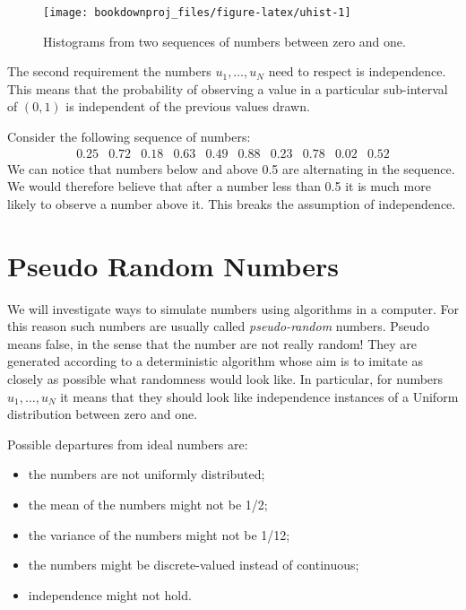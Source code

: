 \documentclass[
]{book}
\begin{document}
\begin{figure}

{\centering \texttt{[image: bookdownproj\_files/figure-latex/uhist-1]} 

}

\caption{Histograms from two sequences of numbers between zero and one.}\label{fig:uhist}
\end{figure}

The second requirement the numbers \(u_1,\dots,u_N\) need to respect is independence. This means that the probability of observing a value in a particular sub-interval of \((0,1)\) is independent of the previous values drawn.

Consider the following sequence of numbers:
\[
\begin{array}{cccccccccc}
0.25 & 0.72 & 0.18 & 0.63 & 0.49 & 0.88 & 0.23 & 0.78 & 0.02 & 0.52
\end{array}
\]
We can notice that numbers below and above 0.5 are alternating in the sequence. We would therefore believe that after a number less than 0.5 it is much more likely to observe a number above it. This breaks the assumption of independence.

\hypertarget{pseudo-random-numbers}{%
\section{Pseudo Random Numbers}\label{pseudo-random-numbers}}

We will investigate ways to simulate numbers using algorithms in a computer. For this reason such numbers are usually called \emph{pseudo-random} numbers. Pseudo means false, in the sense that the number are not really random! They are generated according to a deterministic algorithm whose aim is to imitate as closely as possible what randomness would look like. In particular, for numbers \(u_1,\dots,u_N\) it means that they should look like independence instances of a Uniform distribution between zero and one.

Possible departures from ideal numbers are:

\begin{itemize}
\item
  the numbers are not uniformly distributed;
\item
  the mean of the numbers might not be 1/2;
\item
  the variance of the numbers might not be 1/12;
\item
  the numbers might be discrete-valued instead of continuous;
\item
  independence might not hold.
\end{itemize}
\end{document}
